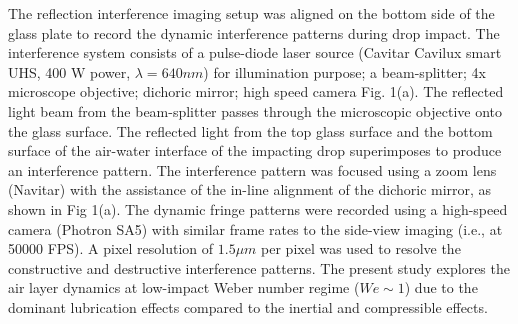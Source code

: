 \documentclass{jfm}
\begin{document}
The reflection interference imaging setup was aligned on the bottom side of the glass plate to record the dynamic interference patterns during drop impact. The interference system consists of a pulse-diode laser source (Cavitar Cavilux smart UHS, 400 W power, ${\lambda}=640nm$) for illumination purpose; a beam-splitter; 4x microscope objective; dichoric mirror; high speed camera Fig. 1(a). The reflected light beam from the beam-splitter passes through the microscopic objective onto the glass surface. The reflected light from the top glass surface and the bottom surface of the air-water interface of the impacting drop superimposes to produce an interference pattern. The interference pattern was focused using a zoom lens (Navitar) with the assistance of the in-line alignment of the dichoric mirror, as shown in Fig 1(a). The dynamic fringe patterns were recorded using a high-speed camera (Photron SA5) with similar frame rates to the side-view imaging (i.e., at 50000 FPS). A pixel resolution of $1.5{\mu}m$ per pixel was used to resolve the constructive and destructive interference patterns. The present study explores the air layer dynamics at low-impact Weber number regime ($We{\sim}1$) due to the dominant lubrication effects compared to the inertial and compressible effects.
\end{document}
